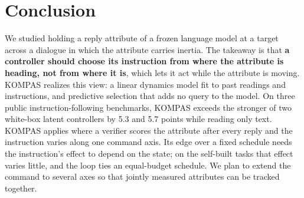\section{Conclusion}
\label{sec:conclusion}
We studied holding a reply attribute of a frozen language model at a target across a dialogue in which the attribute carries inertia.
The takeaway is that \textbf{a controller should choose its instruction from where the attribute is heading, not from where it is}, which lets it act while the attribute is moving.  %
KOMPAS realizes this view: a linear dynamics model fit to past readings and instructions, and predictive selection that adds no query to the model.  %
On three public instruction-following benchmarks, KOMPAS exceeds the stronger of two white-box latent controllers by 5.3 and 5.7 points while reading only text.  %
KOMPAS applies where a verifier scores the attribute after every reply and the instruction varies along one command axis.  %
Its edge over a fixed schedule needs the instruction's effect to depend on the state; on the self-built tasks that effect varies little, and the loop ties an equal-budget schedule.  %
We plan to extend the command to several axes so that jointly measured attributes can be tracked together.  %
